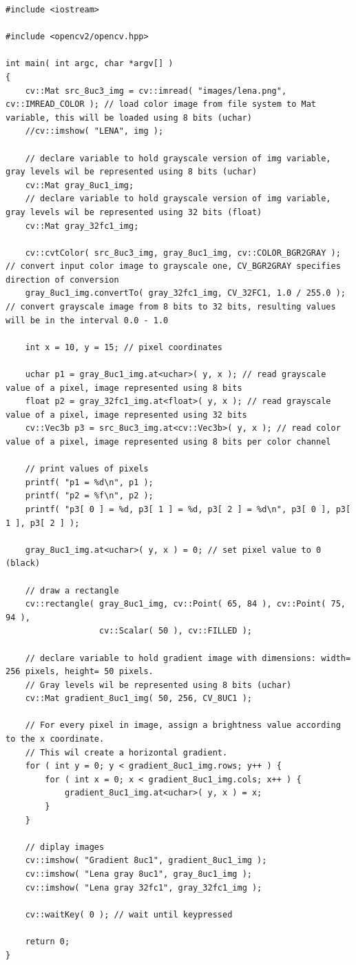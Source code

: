 \documentclass[10pt]{article}
\begin{document}
\begin{lstlisting}[style=CStyle,caption={Full exercise code.},label={lst:full}]
#include <iostream>

#include <opencv2/opencv.hpp>

int main( int argc, char *argv[] )
{
    cv::Mat src_8uc3_img = cv::imread( "images/lena.png", cv::IMREAD_COLOR ); // load color image from file system to Mat variable, this will be loaded using 8 bits (uchar)
    //cv::imshow( "LENA", img );

    // declare variable to hold grayscale version of img variable, gray levels wil be represented using 8 bits (uchar)
    cv::Mat gray_8uc1_img;
    // declare variable to hold grayscale version of img variable, gray levels wil be represented using 32 bits (float)
    cv::Mat gray_32fc1_img;

    cv::cvtColor( src_8uc3_img, gray_8uc1_img, cv::COLOR_BGR2GRAY ); // convert input color image to grayscale one, CV_BGR2GRAY specifies direction of conversion
    gray_8uc1_img.convertTo( gray_32fc1_img, CV_32FC1, 1.0 / 255.0 ); // convert grayscale image from 8 bits to 32 bits, resulting values will be in the interval 0.0 - 1.0

    int x = 10, y = 15; // pixel coordinates

    uchar p1 = gray_8uc1_img.at<uchar>( y, x ); // read grayscale value of a pixel, image represented using 8 bits
    float p2 = gray_32fc1_img.at<float>( y, x ); // read grayscale value of a pixel, image represented using 32 bits
    cv::Vec3b p3 = src_8uc3_img.at<cv::Vec3b>( y, x ); // read color value of a pixel, image represented using 8 bits per color channel

    // print values of pixels
    printf( "p1 = %d\n", p1 );
    printf( "p2 = %f\n", p2 );
    printf( "p3[ 0 ] = %d, p3[ 1 ] = %d, p3[ 2 ] = %d\n", p3[ 0 ], p3[ 1 ], p3[ 2 ] );

    gray_8uc1_img.at<uchar>( y, x ) = 0; // set pixel value to 0 (black)

    // draw a rectangle
    cv::rectangle( gray_8uc1_img, cv::Point( 65, 84 ), cv::Point( 75, 94 ),
                   cv::Scalar( 50 ), cv::FILLED );

    // declare variable to hold gradient image with dimensions: width= 256 pixels, height= 50 pixels.
    // Gray levels wil be represented using 8 bits (uchar)
    cv::Mat gradient_8uc1_img( 50, 256, CV_8UC1 );

    // For every pixel in image, assign a brightness value according to the x coordinate.
    // This wil create a horizontal gradient.
    for ( int y = 0; y < gradient_8uc1_img.rows; y++ ) {
        for ( int x = 0; x < gradient_8uc1_img.cols; x++ ) {
            gradient_8uc1_img.at<uchar>( y, x ) = x;
        }
    }

    // diplay images
    cv::imshow( "Gradient 8uc1", gradient_8uc1_img );
    cv::imshow( "Lena gray 8uc1", gray_8uc1_img );
    cv::imshow( "Lena gray 32fc1", gray_32fc1_img );

    cv::waitKey( 0 ); // wait until keypressed

    return 0;
}
\end{lstlisting}
\end{document}
